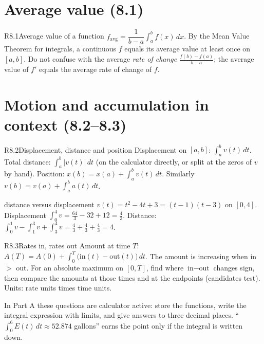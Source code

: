 \documentclass{apcalc}
\begin{document}
\section{Average value (8.1)}

\begin{rulebox}{R8.1}{Average value of a function}
$f_{\text{avg}}=\dfrac{1}{b-a}\displaystyle\int_a^bf(x)\,dx$. By the Mean Value Theorem for integrals, a continuous $f$ equals its average value at least once on $[a,b]$. Do not confuse with the average \emph{rate of change} $\frac{f(b)-f(a)}{b-a}$; the average value of $f'$ equals the average rate of change of $f$.
\end{rulebox}

\section{Motion and accumulation in context (8.2--8.3)}

\begin{rulebox}{R8.2}{Displacement, distance and position}
Displacement on $[a,b]$: $\int_a^bv(t)\,dt$. Total distance: $\int_a^b|v(t)|\,dt$ (on the calculator directly, or split at the zeros of $v$ by hand). Position: $x(b)=x(a)+\int_a^bv(t)\,dt$. Similarly $v(b)=v(a)+\int_a^ba(t)\,dt$.
\end{rulebox}

\begin{example}{distance versus displacement}
$v(t)=t^2-4t+3=(t-1)(t-3)$ on $[0,4]$. Displacement $\int_0^4v=\frac{64}{3}-32+12=\frac43$. Distance: $\int_0^1v-\int_1^3v+\int_3^4v=\frac43+\frac43+\frac43=4$. 
\end{example}

\begin{rulebox}{R8.3}{Rates in, rates out}
Amount at time $T$: $A(T)=A(0)+\int_0^T\big(\text{in}(t)-\text{out}(t)\big)\,dt$. The amount is increasing when in $>$ out. For an absolute maximum on $[0,T]$, find where $\text{in}-\text{out}$ changes sign, then compare the amounts at those times and at the endpoints (candidates test). Units: rate units times time units.
\end{rulebox}

\begin{frqtip}
In Part A these questions are calculator active: store the functions, write the integral expression with limits, and give answers to three decimal places. ``$\int_0^{6}E(t)\,dt\approx 52.874$ gallons'' earns the point only if the integral is written down.
\end{frqtip}
\end{document}
